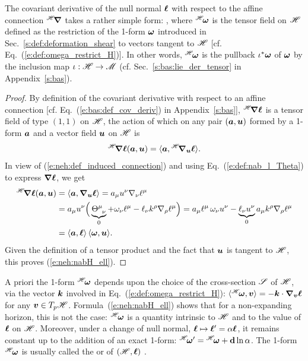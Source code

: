 \begin{prop}
The covariant derivative of the null normal $\bm{\ell}$ with respect to the affine
connection ${}^{\mathscr{H}}\!\bm{\nabla}$ takes a rather simple form:
\be \label{e:neh:nabH_ell}
   \encadre{ {}^\Hor\!\wnab \wl = \wl \otimes {}^\Hor\!\w{\omega} },
\ee
where ${}^{\mathscr{H}}\!\bm{\omega}$ is the tensor field on $\mathscr{H}$
defined as the restriction of the 1-form $\bm{\omega}$
introduced in Sec.~\ref{s:def:deformation_shear}
to vectors tangent to $\mathscr{H}$ [cf. Eq.~(\ref{e:def:omega_restrict_H})].
In other words, ${}^{\mathscr{H}}\!\bm{\omega}$ is the pullback $\iota^*\bm{\omega}$ of
$\bm{\omega}$ by the inclusion map $\iota: \mathscr{H} \to \mathscr{M}$ (cf. Sec.~\ref{s:bas:lie_der_tensor}
in Appendix~\ref{s:bas}).
\end{prop}
\begin{proof}
By definition of the covariant derivative with respect to an
affine connection [cf. Eq.~(\ref{e:bas:def_cov_deriv}) in Appendix~\ref{s:bas}],
${}^{\mathscr{H}}\!\bm{\nabla} \bm{\ell}$ is a tensor field of type $(1,1)$ on $\mathscr{H}$,
the action of which on any pair
$(\bm{a}, \bm{u})$ formed by a 1-form $\bm{a}$ and a vector field $\bm{u}$
on $\mathscr{H}$ is
\[
    {}^{\mathscr{H}}\!\bm{\nabla} \bm{\ell} (\bm{a}, \bm{u}) = \langle \bm{a}, {}^{\mathscr{H}}\!\bm{\nabla}_{\bm{u}} \bm{\ell} \rangle .
\]
In view of (\ref{e:neh:def_induced_connection}) and using Eq.~(\ref{e:def:nab_l_Theta})
to express $\bm{\nabla}\bm{\ell}$, we get
\begin{align}
    {}^{\mathscr{H}}\!\bm{\nabla} \bm{\ell} (\bm{a}, \bm{u}) & = \langle \bm{a}, \bm{\nabla}_{\bm{u}} \bm{\ell} \rangle
       = a_\mu u^\nu \nabla_\nu \ell^\mu \nonumber \\
        & = a_\mu u^\nu \Big( \underbrace{\Theta^\mu_{\ \, \nu}}_{0} + \omega_\nu \ell^\mu
            - \ell_\nu k^\rho \nabla_\rho \ell^\mu \Big)
         = a_\mu \ell^\mu \, \omega_\nu u^\nu - \underbrace{\ell_\nu u^\nu}_{0}
            a_\mu k^\rho \nabla_\rho \ell^\mu \nonumber \\
         & = \langle \bm{a}, \bm{\ell} \rangle \, \langle \bm{\omega}, \bm{u} \rangle . \nonumber
\end{align}
Given the definition of a tensor product and the fact that $\bm{u}$ is tangent to $\mathscr{H}$,
this proves (\ref{e:neh:nabH_ell}).
\end{proof}
A priori the 1-form ${}^{\mathscr{H}}\!\bm{\omega}$ depends upon the choice of the cross-section $\mathscr{S}$
of $\mathscr{H}$, via the vector $\bm{k}$ involved in Eq.~(\ref{e:def:omega_restrict_H}):
$\langle {}^{\mathscr{H}}\!\bm{\omega}, \bm{v} \rangle = - \bm{k} \cdot\bm{\nabla}_{\bm{v}} \bm{\ell}$
for any $\bm{v}\in T_p\mathscr{H}$. Formula~(\ref{e:neh:nabH_ell}) shows that for a non-expanding
horizon, this is not the case: ${}^{\mathscr{H}}\!\bm{\omega}$ is  a quantity intrinsic to $\mathscr{H}$ and to the value of $\bm{\ell}$ on $\mathscr{H}$.
Moreover, under a change of null normal, $\bm{\ell} \mapsto \bm{\ell}' = \alpha \bm{\ell}$,
it remains constant up to the addition of an exact 1-form:
${}^{\mathscr{H}}\!\bm{\omega}' = {}^{\mathscr{H}}\!\bm{\omega} + \mathbf{d}\ln\alpha$.
The 1-form ${}^{\mathscr{H}}\!\bm{\omega}$
is usually called the  or 
of $(\mathscr{H}, \bm{\ell})$ \cite{AshteBL02,GourgJ06}.

